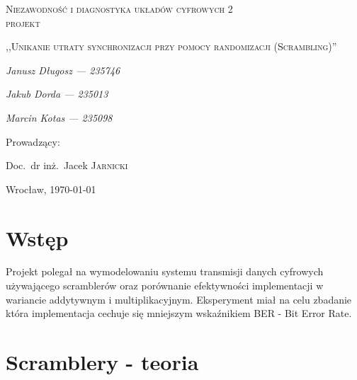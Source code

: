 \documentclass[polish, 11pt]{article}
\begin{document}
\begin{titlepage}
    \centering
    {\scshape\LARGE Niezawodność i diagnostyka układów cyfrowych 2\\ projekt \par}
    \vspace{1cm}
    {\scshape\Large,,Unikanie utraty synchronizacji przy pomocy randomizacji (Scrambling)''\par}
    \vspace{2cm}
    {\itshape\Large Janusz Długosz --- 235746\/\par}
    {\itshape\Large Jakub Dorda --- 235013\/\par}
    {\itshape\Large Marcin Kotas --- 235098\/\par}
    \vfill
    Prowadzący:\par
    Doc.~dr inż.~Jacek \textsc{Jarnicki}

    \vfill

    {\large Wrocław, \today\par}

\end{titlepage}

\tableofcontents
\newpage

\section{Wstęp}
	Projekt polegał na wymodelowaniu systemu transmisji danych cyfrowych używającego scramblerów oraz porównanie efektywności implementacji w wariancie
	addytywnym i multiplikacyjnym. Eksperyment miał na celu zbadanie która implementacja cechuje się mniejszym wskaźnikiem BER - Bit Error Rate.

\section{Scramblery - teoria}
\end{document}
